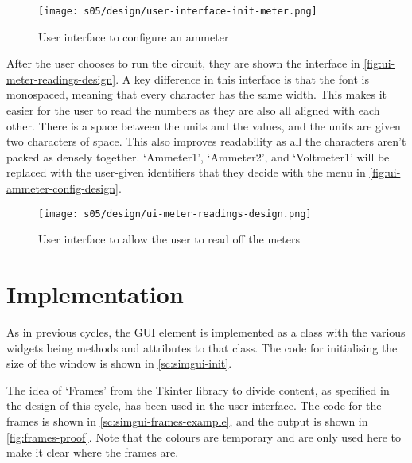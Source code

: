         \begin{figure}[!ht]
            \centering
            \texttt{[image: s05/design/user-interface-init-meter.png]}
            \caption{User interface to configure an ammeter}
            \label{fig:ui-ammeter-config-design}
        \end{figure}

        After the user chooses to run the circuit, they are shown the interface in \autoref{fig:ui-meter-readings-design}. 
        A key difference in this interface is that the font is monospaced, meaning that every character has the same width.
        This makes it easier for the user to read the numbers as they are also all aligned with each other. 
        There is a space between the units and the values, and the units are given two characters of space. 
        This also improves readability as all the characters aren't packed as densely together. 
        `Ammeter1', `Ammeter2', and `Voltmeter1' will be replaced with the user-given identifiers that they decide with the menu in \autoref{fig:ui-ammeter-config-design}. 

        \begin{figure}[!ht]
            \centering
            \texttt{[image: s05/design/ui-meter-readings-design.png]}
            \caption{User interface to allow the user to read off the meters}
            \label{fig:ui-meter-readings-design}
        \end{figure}





\section{Implementation}



    As in previous cycles, the GUI element is implemented as a class with the various widgets being methods and attributes to that class. The code for initialising the size of the window is shown in \autoref{sc:simgui-init}. 

    The idea of `Frames' from the Tkinter library to divide content, as specified in the design of this cycle, has been used in the user-interface. 
    The code for the frames is shown in \autoref{sc:simgui-frames-example}, and the output is shown in \autoref{fig:frames-proof}. 
    Note that the colours are temporary and are only used here to make it clear where the frames are. 

